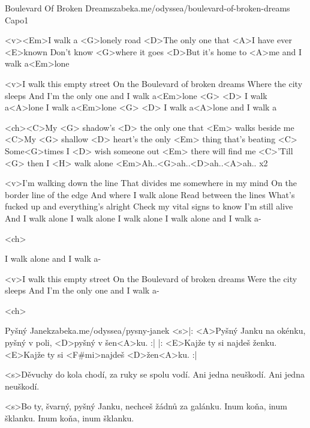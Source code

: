 \begin{song}{52}{Boulevard Of Broken Dreams}{zabeka.me/odyssea/boulevard-of-broken-dreams}
	Capo1

	<v><Em>I walk a <G>lonely road
	<D>The only one that <A>I have ever <E>known
	Don't know <G>where it goes
	<D>But it's home to <A>me and I walk a<Em>lone

	<v>I walk this empty street
	On the Boulevard of broken dreams
	Where the city sleeps
	And I'm the only one and I walk a<Em>lone <G>
	<D> I walk a<A>lone I walk a<Em>lone <G>
	<D> I walk a<A>lone and I walk a

	<ch><C>My <G> shadow's <D> the only one that <Em> walks beside me
	<C>My <G> shallow <D> heart's the only <Em> thing that's beating
	<C> Some<G>times I <D> wish someone out <Em> there will find me
	<C>'Till <G> then I <H> walk alone
	<Em>Ah..<G>ah..<D>ah..<A>ah.. x2

	<v>I'm walking down the line
	That divides me somewhere in my mind
	On the border line of the edge
	And where I walk alone
	Read between the lines
	What's fucked up and everything's alright
	Check my vital signs to know I'm still alive
	And I walk alone
	I walk alone I walk alone
	I walk alone and I walk a-

	<ch>

	I walk alone and I walk a-

	<v>I walk this empty street
	On the Boulevard of broken dreams
	Were the city sleeps
	And I'm the only one and I walk a-

	<ch>

\end{song}
\begin{song}{53}{Pyšný Janek}{zabeka.me/odyssea/pysny-janek}
	<s>|: <A>Pyšný Janku na okénku,
	pyšný v poli, <D>pyšný v šen<A>ku. :|
	|: <E>Kajže ty si najdeš ženku.
	<E>Kajže ty si <F#mi>najdeš <D>žen<A>ku. :|

	<s>Děvuchy do kola chodí, za ruky se spolu vodí.
	Ani jedna neuškodí. Ani jedna neuškodí.

	<s>Bo ty, švarný, pyšný Janku, nechceš žádnů za galánku.
	Inum koňa, inum šklanku. Inum koňa, inum šklanku.

\end{song}
